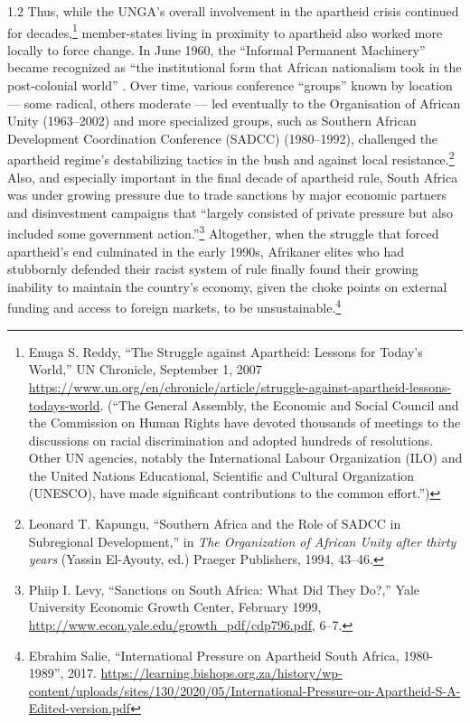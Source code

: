 \documentclass[../unravbook.tex]{subfiles}
\begin{document}
\begin{spacing}{1.2}
Thus, while the UNGA's overall involvement in the apartheid crisis continued for decades,\footnote{Enuga S. Reddy, \enquote{The Struggle against Apartheid: Lessons for Today's World,} UN Chronicle, September 1, 2007 \url{https://www.un.org/en/chronicle/article/struggle-against-apartheid-lessons-todays-world}. (``The General Assembly, the Economic and Social Council and the Commission on Human Rights have devoted thousands of meetings to the discussions on racial discrimination and adopted hundreds of resolutions. Other UN agencies, notably the International Labour Organization (ILO) and the United Nations Educational, Scientific and Cultural Organization (UNESCO), have made significant contributions to the common effort.'')} member-states living in proximity to apartheid also worked more locally to force change. In June 1960, the \enquote{Informal Permanent Machinery} became recognized as \enquote{the institutional form that African nationalism took in the post-colonial world} \parencite[52]{Irwin-2012}. Over time, various conference \enquote{groups} known by location --- some radical, others moderate --- led eventually to the Organisation of African Unity (1963--2002) and more specialized groups, such as Southern African Development Coordination Conference (SADCC) (1980--1992), challenged the apartheid regime's destabilizing tactics in the bush and against local resistance.\footnote{Leonard T. Kapungu, \enquote{Southern Africa and the Role of SADCC in Subregional Development,} in \textit{The Organization of African Unity after thirty years} (Yassin El-Ayouty, ed.) Praeger Publishers, 1994, 43--46.} Also, and especially important in the final decade of apartheid rule, South Africa was under growing pressure due to trade sanctions by major economic partners and disinvestment campaigns that \enquote{largely consisted of private pressure but also included some government action.}\footnote{Phiip I. Levy, \enquote{Sanctions on South Africa: What Did They Do?,} Yale University Economic Growth Center, February 1999, \url{http://www.econ.yale.edu/growth_pdf/cdp796.pdf}, 6--7.} Altogether, when the struggle that forced apartheid's end culminated in the early 1990s, Afrikaner elites who had stubbornly defended their racist system of rule finally found their growing inability to maintain the country's economy, given the choke points on external funding and access to foreign markets, to be unsustainable.\footnote{Ebrahim Salie, \enquote{International Pressure on Apartheid South Africa, 1980-1989}, 2017. \url{https://learning.bishops.org.za/history/wp-content/uploads/sites/130/2020/05/International-Pressure-on-Apartheid-S-A-Edited-version.pdf}} 


\end{spacing}
\end{document}
